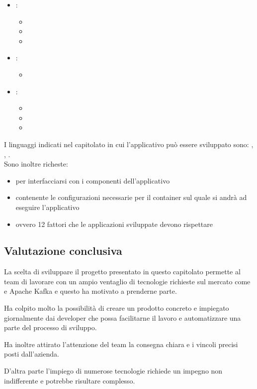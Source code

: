     \begin{itemize}
        \item {}:
        \begin{itemize}
            \item {}
            \item {}
            \item {}
        \end{itemize}
        \item {}:
        \begin{itemize}
            \item {}
        \end{itemize}
        \item {}:
        \begin{itemize}
            \item {}
            \item {}
            \item {}
        \end{itemize}
    \end{itemize}
    I linguaggi indicati nel capitolato in cui l'applicativo può essere sviluppato sono: , , .\\
    Sono inoltre richeste:
    \begin{itemize}
        \item {} per interfacciarsi con i componenti dell'applicativo
        \item {} contenente le configurazioni necessarie per il container sul quale si andrà ad eseguire l'applicativo
        \item {} ovvero 12 fattori che le applicazioni sviluppate devono rispettare
    \end{itemize}

    \subsection{Valutazione conclusiva}
    La scelta di sviluppare il progetto presentato in questo capitolato permette al team di lavorare con un ampio ventaglio di tecnologie
    richieste sul mercato come  e Apache Kafka e questo ha motivato \gruppo a prenderne parte.\par
    Ha colpito molto la possibilità di creare un prodotto concreto e impiegato giornalmente dai developer che possa facilitarne il lavoro
    e automatizzare una parte del processo di sviluppo.\par
    Ha inoltre attirato l'attenzione del team la consegna chiara e i vincoli precisi posti dall'azienda.\par
    D'altra parte l'impiego di numerose tecnologie richiede un impegno non indifferente e potrebbe risultare complesso.
